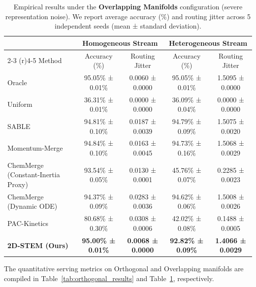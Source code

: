 \begin{table}[t]
\caption{Empirical results under the \textbf{Overlapping Manifolds} configuration (severe representation noise). We report average accuracy (\%) and routing jitter across 5 independent seeds (mean ± standard deviation).}
\label{tab:overlapping_results}
\vskip 0.15in
\begin{center}
\begin{small}
\begin{sc}
\begin{tabular}{lcccc}
\toprule
& \multicolumn{2}{c}{Homogeneous Stream} & \multicolumn{2}{c}{Heterogeneous Stream} \\
\cmidrule(r){2-3} \cmidrule(r){4-5}
Method & Accuracy (\%) & Routing Jitter & Accuracy (\%) & Routing Jitter \\
\midrule
Oracle & 95.05\% ± 0.01\% & 0.0060 ± 0.0000 & 95.05\% ± 0.01\% & 1.5095 ± 0.0000 \\
Uniform & 36.31\% ± 0.01\% & 0.0000 ± 0.0000 & 36.09\% ± 0.04\% & 0.0000 ± 0.0000 \\
\midrule
SABLE & 94.81\% ± 0.10\% & 0.0187 ± 0.0039 & 94.79\% ± 0.09\% & 1.5075 ± 0.0020 \\
Momentum-Merge & 94.84\% ± 0.10\% & 0.0163 ± 0.0045 & 94.73\% ± 0.16\% & 1.5068 ± 0.0029 \\
ChemMerge (Constant-Inertia Proxy) & 93.54\% ± 0.05\% & 0.0130 ± 0.0001 & 45.76\% ± 0.07\% & 0.2285 ± 0.0023 \\
ChemMerge (Dynamic ODE) & 94.37\% ± 0.09\% & 0.0283 ± 0.0036 & 94.62\% ± 0.06\% & 1.5008 ± 0.0026 \\
PAC-Kinetics & 80.68\% ± 0.30\% & 0.0308 ± 0.0006 & 42.02\% ± 0.08\% & 0.1488 ± 0.0005 \\
\midrule
\textbf{2D-STEM (Ours)} & \textbf{95.00\% ± 0.01\%} & \textbf{0.0068 ± 0.0000} & \textbf{92.82\% ± 0.09\%} & \textbf{1.4066 ± 0.0029} \\
\bottomrule
\end{tabular}
\end{sc}
\end{small}
\end{center}
\vskip -0.1in
\end{table}

The quantitative serving metrics on Orthogonal and Overlapping manifolds are compiled in Table~\ref{tab:orthogonal_results} and Table~\ref{tab:overlapping_results}, respectively.

